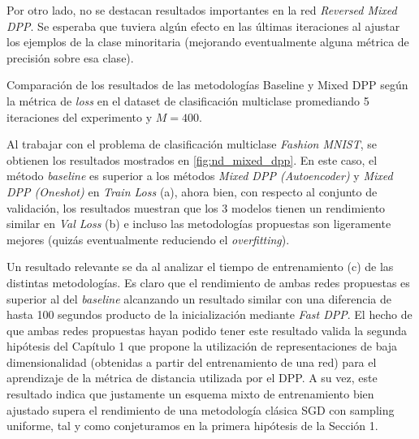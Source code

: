 \vspace{0.2cm}

Por otro lado, no se destacan resultados importantes en la red \textit{Reversed Mixed DPP}. Se esperaba que tuviera algún efecto en las últimas iteraciones al ajustar los ejemplos de la clase minoritaria (mejorando eventualmente alguna métrica de precisión sobre esa clase). 

\begin{images}[\label{fig:nd_mixed_dpp}]{\centering Comparación de los resultados de las metodologías Baseline y Mixed DPP según la métrica de \textit{loss} en el dataset de clasificación multiclase promediando 5 iteraciones del experimento y $M=400$.}

\end{images}


Al trabajar con el problema de clasificación multiclase \textit{Fashion MNIST}, se obtienen los resultados mostrados en \ref{fig:nd_mixed_dpp}. En este caso, el método \textit{baseline} es superior a los métodos \textit{Mixed DPP (Autoencoder)} y \textit{Mixed DPP (Oneshot)} en \textit{Train Loss} (a), ahora bien, con respecto al conjunto de validación, los resultados muestran que los 3 modelos tienen un rendimiento similar en \textit{Val Loss} (b) e incluso las metodologías propuestas son ligeramente mejores (quizás eventualmente reduciendo el \textit{overfitting}).

\vspace{0.2cm}

Un resultado relevante se da al analizar el tiempo de entrenamiento (c) de las distintas metodologías. Es claro que el rendimiento de ambas redes propuestas es superior al del \textit{baseline} alcanzando un resultado similar con una diferencia de hasta 100 segundos producto de la inicialización mediante \textit{Fast DPP}. El hecho de que ambas redes propuestas hayan podido tener este resultado valida la segunda hipótesis del Capítulo 1 que propone la utilización de representaciones de baja dimensionalidad (obtenidas a partir del entrenamiento de una red) para el aprendizaje de la métrica de distancia utilizada por el DPP. A su vez, este resultado indica que justamente un esquema mixto de entrenamiento bien ajustado supera el rendimiento de una metodología clásica SGD con sampling uniforme, tal y como conjeturamos en la primera hipótesis de la Sección 1. 

